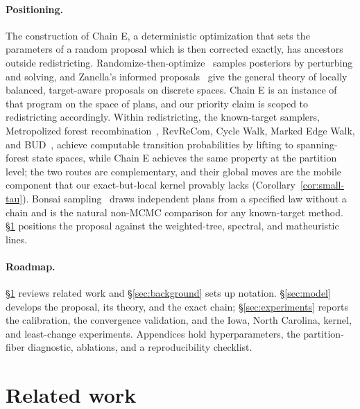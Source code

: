 \documentclass[11pt]{article}
\begin{document}
\paragraph{Positioning.} The construction of Chain E, a deterministic
optimization that sets the parameters of a random proposal which is
then corrected exactly, has ancestors outside redistricting.
Randomize-then-optimize~\cite{bardsley2014randomize} samples
posteriors by perturbing and solving, and Zanella's informed
proposals~\cite{zanella2020informed} give the general theory of
locally balanced, target-aware proposals on discrete spaces. Chain E
is an instance of that program on the space of plans, and our
priority claim is scoped to redistricting accordingly. Within
redistricting, the known-target samplers, Metropolized forest
recombination~\cite{autry2023metropolized}, RevReCom, Cycle Walk,
Marked Edge Walk, and
BUD~\cite{cannon2022spanning,deford2025cycle,mcwhorter2025marked,
akitaya2026bud}, achieve computable transition probabilities by
lifting to spanning-forest state spaces, while Chain E achieves the
same property at the partition level; the two routes are
complementary, and their global moves are the mobile component that
our exact-but-local kernel provably lacks
(Corollary~\ref{cor:small-tau}). Bonsai
sampling~\cite{clelland2026bonsai} draws independent plans from a
specified law without a chain and is the natural non-MCMC comparison
for any known-target method. \S\ref{sec:related} positions the
proposal against the weighted-tree, spectral, and matheuristic lines.

\paragraph{Roadmap.}\label{sec:intro-roadmap}
\S\ref{sec:related} reviews related work and \S\ref{sec:background}
sets up notation. \S\ref{sec:model} develops the proposal, its
theory, and the exact chain; \S\ref{sec:experiments} reports the
calibration, the convergence validation, and the Iowa, North
Carolina, kernel, and least-change experiments. Appendices hold
hyperparameters, the partition-fiber diagnostic, ablations, and a
reproducibility checklist.

\section{Related work}\label{sec:related}
\end{document}
